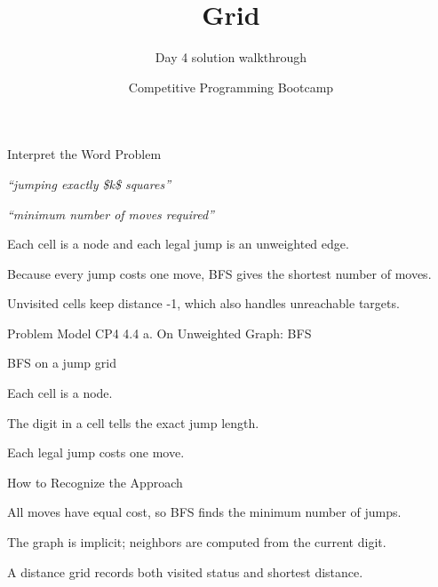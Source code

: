 \documentclass[aspectratio=169,11pt]{beamer}
\title[grid]{Grid}
\subtitle{Day 4 solution walkthrough}
\author[Solution Deck]{Competitive Programming Bootcamp}
\date{}
\begin{document}
\begin{frame}[plain]
  \titlepage
\end{frame}

\begin{frame}{Interpret the Word Problem}
\small
{}
\begin{tightitemize}
  \item \textit{``jumping exactly \$k\$ squares''}
  \item \textit{``minimum number of moves required''}
\end{tightitemize}

\vspace{0.18cm}
\begin{tightitemize}
  \item Each cell is a node and each legal jump is an unweighted edge.
  \item Because every jump costs one move, BFS gives the shortest number of moves.
  \item Unvisited cells keep distance -1, which also handles unreachable targets.
\end{tightitemize}
\end{frame}







\begin{frame}{Problem Model}
\small
{} CP4 4.4 a. On Unweighted Graph: BFS

\vspace{0.25cm}
 BFS on a jump grid

\vspace{0.25cm}
\begin{tightitemize}
  \item Each cell is a node.
  \item The digit in a cell tells the exact jump length.
  \item Each legal jump costs one move.
\end{tightitemize}
\end{frame}

\begin{frame}{How to Recognize the Approach}
\begin{tightitemize}
  \item All moves have equal cost, so BFS finds the minimum number of jumps.
  \item The graph is implicit; neighbors are computed from the current digit.
  \item A distance grid records both visited status and shortest distance.
\end{tightitemize}
\end{frame}
\end{document}

